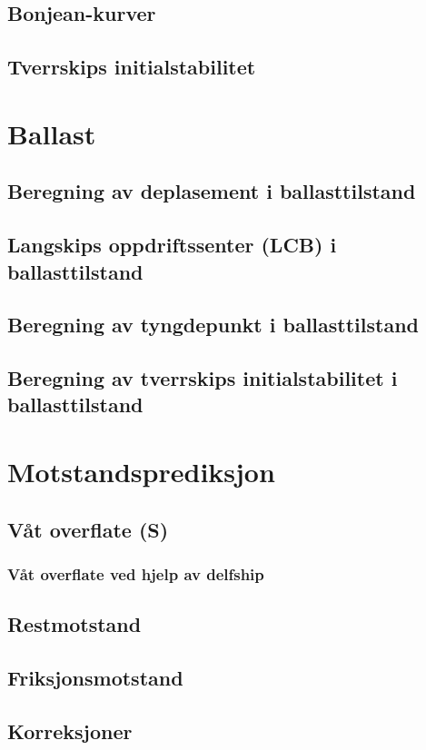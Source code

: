 \documentclass[norsk]{article}
\begin{document}
  	\subsection{Bonjean-kurver}
  	\subsection{Tverrskips initialstabilitet}
  	
\section{Ballast}
	\subsection{Beregning av deplasement i ballasttilstand}
	\subsection{Langskips oppdriftssenter (LCB) i ballasttilstand}
	\subsection{Beregning av tyngdepunkt i ballasttilstand}
	\subsection{Beregning av tverrskips initialstabilitet i ballasttilstand}
	
\section{Motstandsprediksjon}
	\subsection{Våt overflate (S)}
		\subsubsection{Våt overflate ved hjelp av delfship}
	\subsection{Restmotstand}
	\subsection{Friksjonsmotstand}
	\subsection{Korreksjoner}
\end{document}
